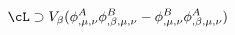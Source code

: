 \begin{equation}
\cL \supset V_{\beta} ( \phi^A_{, \mu , \nu} \phi^B_{, \beta , \mu , \nu} -
\phi^B_{, \mu , \nu} \phi^A_{,\beta , \mu , \nu} )
\end{equation} 
